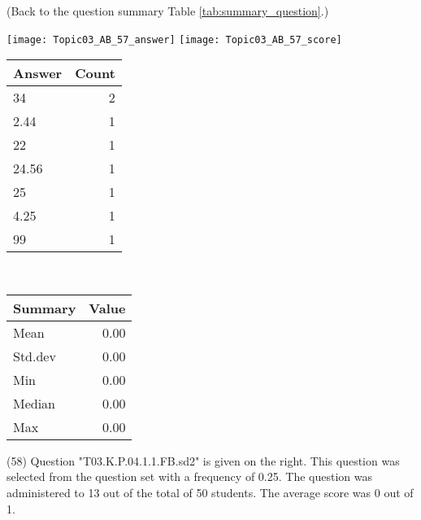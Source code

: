 \documentclass[12pt,english,nohyper]{tufte-handout}\usepackage[]{graphicx}\usepackage[]{color}
\begin{document}
 (Back to the question summary Table \ref{tab:summary_question}.)

\begin{center} \texttt{[image: Topic03\_AB\_57\_answer]} \texttt{[image: Topic03\_AB\_57\_score]} \end{center} 

\begin{center}%
\begin{tabular}{lr}
  \hline
Answer & Count \\ 
  \hline
34 &   2 \\ 
  2.44 &   1 \\ 
  22 &   1 \\ 
  24.56 &   1 \\ 
  25 &   1 \\ 
  4.25 &   1 \\ 
  99 &   1 \\ 
   \hline
\end{tabular}
~~~~~~~~%
\begin{tabular}{lr}
  \hline
Summary & Value \\ 
  \hline
Mean & 0.00 \\ 
  Std.dev & 0.00 \\ 
  Min & 0.00 \\ 
  Median & 0.00 \\ 
  Max & 0.00 \\ 
   \hline
\end{tabular}
\end{center}\newpage{} (58) Question "T03.K.P.04.1.1.FB.sd2" is given on the right. This question was selected from the question set with a frequency of 0.25. The question was administered to 13 out of the total of 50 students. The average score was 0 out of 1.
\end{document}
